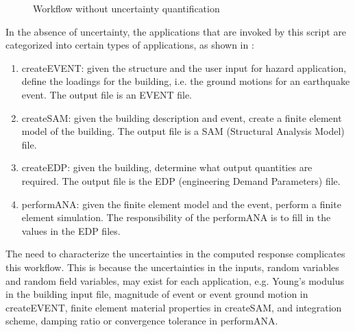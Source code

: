 \begin{figure}[!htbp]
  \caption{Workflow without uncertainty quantification}
  \label{fig:figure17}
\end{figure}


In the absence of uncertainty, the applications that are invoked by
this script are categorized into certain types of applications, as shown 
in :
\begin{enumerate}
\item createEVENT: given the structure and the user input for hazard
  application, define the loadings for the building, i.e. the ground
  motions for an earthquake event. The output file is an EVENT file.
\item createSAM: given the building description and event, create a
  finite element model of the building. The output file is a SAM
  (Structural Analysis Model) file.
\item createEDP: given the building, determine what output quantities
  are required. The output file is the EDP (engineering Demand
  Parameters) file.
\item performANA: given the finite element model and the event,
  perform a finite element simulation. The responsibility of the
  performANA is to fill in the values in the EDP files.
\end{enumerate}


The need to characterize the uncertainties in the computed response
complicates this workflow. This is because the uncertainties in the
inputs, random variables and random field variables, may exist for
each application, e.g. Young’s modulus in the building input file,
magnitude of event or event ground motion in createEVENT, finite
element material properties in createSAM, and integration scheme,
damping ratio or convergence tolerance in performANA.

